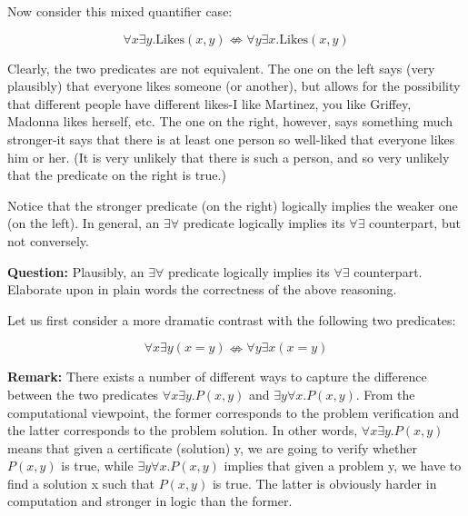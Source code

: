 \documentclass{article}
\begin{document}
Now consider this mixed quantifier case:

\begin{equation*}
  \forall x \exists y \text{.Likes}(x, y) \nLeftrightarrow  \forall y \exists x \text{.Likes}(x, y)
\end{equation*}

Clearly, the two predicates are not equivalent. The one on the left says (very plausibly) that everyone likes someone (or another), but allows for the possibility that different people have different likes-I like Martinez, you like Griffey, Madonna likes herself, etc. The one on the right, however, says something much stronger-it says that there is at least one person so well-liked that everyone likes him or her. (It is very unlikely that there is such a person, and so very unlikely that the predicate on the right is true.)

Notice that the stronger predicate (on the right) logically implies the weaker one (on the left). In general, an $\exists \forall$ predicate logically implies its $\forall \exists$ counterpart, but not conversely.

\begin{tcolorbox}
  \textbf{Question:} Plausibly, an $\exists \forall$ predicate logically implies its $\forall \exists$ counterpart. Elaborate upon in plain words the correctness of the above reasoning.
  
  Let us first consider a more dramatic contrast with the following two predicates:

  \begin{equation*}
    \forall x \exists y (x = y) \nLeftrightarrow  \forall y \exists x (x = y)
  \end{equation*}
\end{tcolorbox}

\begin{tcolorbox}
  \textbf{Remark:} There exists a number of different ways to capture the difference between the two predicates $\forall x \exists y .P (x, y)$ and $\exists y \forall x.P (x, y)$. From the computational viewpoint, the former corresponds to the problem verification and the latter corresponds to the problem solution. In other words, $\forall x \exists y .P (x, y)$ means that given a certificate (solution) y, we are going to verify whether $P (x, y)$ is true, while $\exists y \forall x .P (x, y)$ implies that given a problem y, we have to find a solution x such that $P (x, y)$ is true. The latter is obviously harder in computation and stronger in logic than the former.
\end{tcolorbox}
\end{document}
